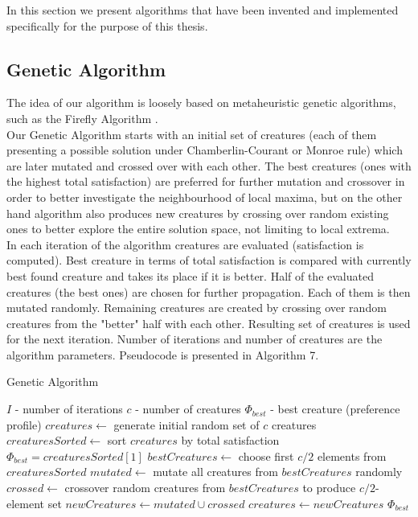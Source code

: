 In this section we present algorithms that have been invented and implemented specifically for the purpose of this thesis.

\subsection{Genetic Algorithm}

The idea of our algorithm is loosely based on metaheuristic genetic algorithms, such as the Firefly Algorithm \cite{6}.
\\

Our Genetic Algorithm starts with an initial set of creatures (each of them presenting a possible solution under Chamberlin-Courant or Monroe rule) which are later mutated and crossed over with each other. The best creatures (ones with the highest total satisfaction) are preferred for further mutation and crossover in order to better investigate the neighbourhood of local maxima, but on the other hand algorithm also produces new creatures by crossing over random existing ones to better explore the entire solution space, not limiting to local extrema.
\\

In each iteration of the algorithm creatures are evaluated (satisfaction is computed). Best creature in terms of total satisfaction is compared with currently best found creature and takes its place if it is better. Half of the evaluated creatures (the best ones) are chosen for further propagation. Each of them is then mutated randomly. Remaining creatures are created by crossing over random creatures from the "better" half with each other. Resulting set of creatures is used for the next iteration. Number of iterations and number of creatures are the algorithm parameters. Pseudocode is presented in Algorithm 7.

\begin{algorithm}
\caption{Genetic Algorithm}\label{euclid}
\begin{algorithmic}[1]
		\State $I$ - number of iterations
		\State $c$ - number of creatures
		\State $\Phi_{best}$ - best creature (preference profile)
		\State $creatures \gets$ generate initial random set of $c$ creatures
			\State $creaturesSorted \gets$ sort $creatures$ by total satisfaction
				\State $\Phi_{best} = creaturesSorted[1]$
			\EndIf
			\State $bestCreatures \gets$ choose first $c/2$ elements from $creaturesSorted$
			\State $mutated \gets$ mutate all creatures from $bestCreatures$ randomly
			\State $crossed \gets$ crossover random creatures from $bestCreatures$ to produce $c/2$-element set
			\State $newCreatures \gets mutated \cup crossed$
			\State $creatures \gets newCreatures$
		\EndFor
		\State \Return $\Phi_{best}$
	\EndProcedure
\end{algorithmic}
\end{algorithm}


